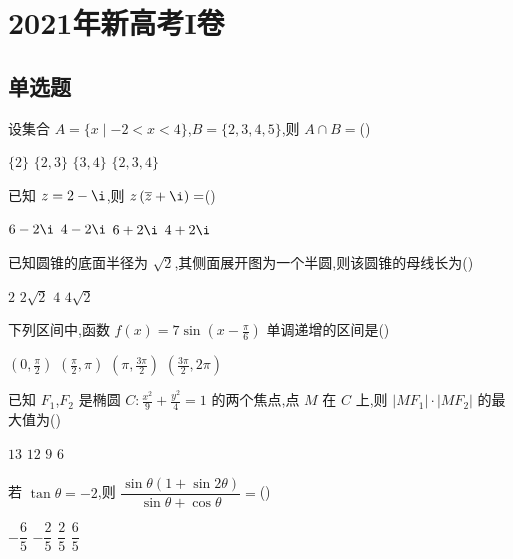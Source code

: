 \chapter{2021年新高考I卷}

\section{单选题}

\begin{problem}
设集合 \(A=\{x\mid -2<x<4\}\),\(B=\{2,3,4,5\}\),则 \(A\cap B=\)(\quad)

\choices
    {\(\{2\}\)}
    {\(\{2,3\}\)}
    {\(\{3,4\}\)}
    {\(\{2,3,4\}\)}
\end{problem}

\begin{problem}
已知 \(z=2-\i\),则 \(z\left( \overline{z}+\i \right)=\)(\quad)

\choices
    {\(6-2\i\)}
    {\(4-2\i\)}
    {\(6+2\i\)}
    {\(4+2\i\)}
\end{problem}

\begin{problem}
已知圆锥的底面半径为 \(\sqrt{2}\),其侧面展开图为一个半圆,则该圆锥的母线长为(\quad)

\choices
    {\(2\)}
    {\(2\sqrt{2}\)}
    {\(4\)}
    {\(4\sqrt{2}\)}
\end{problem}

\begin{problem}
下列区间中,函数 \(f(x)=7\sin\left( x-\frac{\pi}{6}\right)\) 单调递增的区间是(\quad)

\choices
    {\(\left( 0,\frac{\pi}{2}\right)\)}
    {\(\left( \frac{\pi}{2},\pi\right)\)}
    {\(\left( \pi,\frac{3\pi}{2}\right)\)}
    {\(\left( \frac{3\pi}{2},2\pi\right)\)}
\end{problem}

\begin{problem}
已知 \(F_1\),\(F_2\) 是椭圆 \(C:\frac{x^2}{9}+\frac{y^2}{4}=1\) 的两个焦点,点 \(M\) 在 \(C\) 上,则 \(|MF_1|\cdot|MF_2|\) 的最大值为(\quad)

\choices
    {\(13\)}
    {\(12\)}
    {\(9\)}
    {\(6\)}
\end{problem}

\begin{problem}
若 \(\tan\theta=-2\),则 \(\dfrac{\sin\theta\left( 1+\sin2\theta \right)}{\sin\theta+\cos\theta}=\)(\quad)

\choices
    {\(-\dfrac{6}{5}\)}
    {\(-\dfrac{2}{5}\)}
    {\(\dfrac{2}{5}\)}
    {\(\dfrac{6}{5}\)}
\end{problem}

